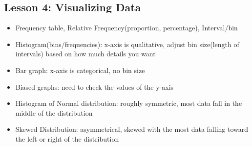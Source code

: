 \documentclass[twoside,12pt]{article}
\begin{document}
\subsection{Lesson 4: Visualizing Data}
\begin{itemize}
\item Frequency table, Relative Frequency(proportion, percentage), Interval/bin
\item Histogram(bins/frequencies): x-axis is qualitative, adjust bin size(length of intervals) based on how much details you want
\item Bar graph: x-axis is categorical, no bin size
\item Biased graphs: need to check the values of the y-axis
\item Histogram of Normal distribution: roughly symmetric, most data fall in the middle of the distribution
\item Skewed Distribution: asymmetrical, skewed with the most data falling toward the left or right of the distribution 
\end{itemize}
\end{document}
